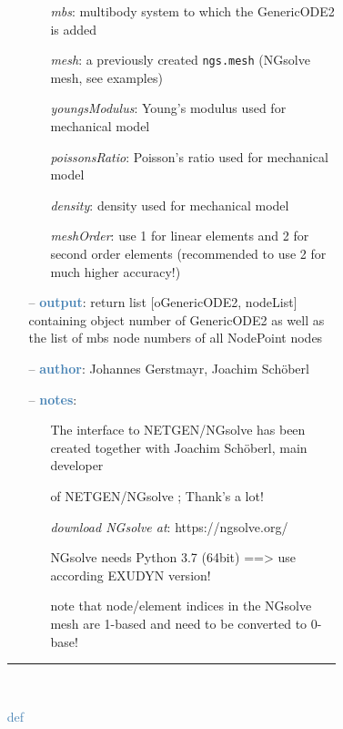 \begin{itemize}[leftmargin=1.4cm]
\begin{itemize}[leftmargin=1.4cm]
\begin{itemize}[leftmargin=0.5cm]
\begin{itemize}[leftmargin=1.4cm]
\begin{itemize}[leftmargin=1.4cm]
\begin{itemize}[leftmargin=0.5cm]
\begin{itemize}[leftmargin=0.7cm]
  \begin{itemize}[leftmargin=1.2cm]
\setlength{\itemindent}{-0.7cm}
    \item[] {\it mbs}: multibody system to which the GenericODE2 is added
    \item[] {\it     mesh}: a previously created \texttt{ngs.mesh} (NGsolve mesh, see examples)
    \item[] {\it     youngsModulus}: Young's modulus used for mechanical model
    \item[] {\it     poissonsRatio}: Poisson's ratio used for mechanical model
    \item[] {\it     density}: density used for mechanical model
    \item[] {\it     meshOrder}: use 1 for linear elements and 2 for second order elements (recommended to use 2 for much higher accuracy!)
  \end{itemize}
  \item[--]  \textcolor{steelblue}{\bf output}: return list [oGenericODE2, nodeList] containing object number of GenericODE2 as well as the list of mbs node numbers of all NodePoint nodes  \item[--]  \textcolor{steelblue}{\bf author}: Johannes Gerstmayr, Joachim Sch\"oberl  \item[--]  \textcolor{steelblue}{\bf notes}: \vspace{-6pt}
  \begin{itemize}[leftmargin=1.2cm]
\setlength{\itemindent}{-0.7cm}
    \item[] The interface to NETGEN/NGsolve has been created together with Joachim Sch\"oberl, main developer
    \item[]   of NETGEN/NGsolve \cite{Schoeberl1997,NGsolve2014}; Thank's a lot!
    \item[] {\it   download NGsolve at}: https://ngsolve.org/
    \item[]   NGsolve needs Python 3.7 (64bit) ==> use according EXUDYN version!
    \item[]   note that node/element indices in the NGsolve mesh are 1-based and need to be converted to 0-base!
  \end{itemize}
\vspace{12pt}\end{itemize}
%
\noindent\rule{8cm}{0.75pt}\vspace{1pt} \\ 
\begin{flushleft}
\noindent \textcolor{steelblue}{def {\bf {}}}\label{sec:FEM:FEMinterface:ComputeEigenmodes}

\end{flushleft}
\end{itemize}
\end{itemize}
\end{itemize}
\end{itemize}
\end{itemize}
\end{itemize}
